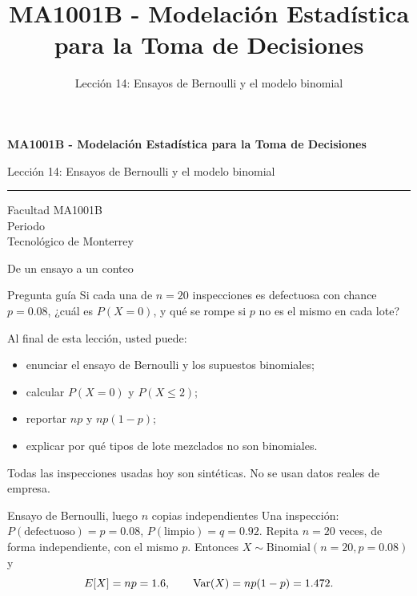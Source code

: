 \documentclass[aspectratio=169,10pt,spanish]{beamer}
\title{MA1001B - Modelación Estadística para la Toma de Decisiones}
\subtitle{Lección 14: Ensayos de Bernoulli y el modelo binomial}
\author{}
\institute{Tecnol\'ogico de Monterrey}
\date{}
\begin{document}
\begin{frame}[plain]
  \vspace{1.2cm}
  {\Large\bfseries MA1001B - Modelación Estadística para la Toma de Decisiones\par}
  \vspace{0.7cm}
  {\large Lección 14: Ensayos de Bernoulli y el modelo binomial\par}
  \vspace{0.7cm}
  {\color{TecRojo}\rule{\textwidth}{1.2pt}}
  \vspace{0.8cm}

  Facultad MA1001B\\[0.3cm]
  Periodo\\[0.3cm]
  Tecnol\'ogico de Monterrey
\end{frame}

\begin{frame}{De un ensayo a un conteo}
  \begin{alertblock}{Pregunta guía}
    Si cada una de $n=20$ inspecciones es defectuosa con chance $p=0.08$,
    ¿cuál es $P(X=0)$, y qué se rompe si $p$ no es el mismo en cada lote?
  \end{alertblock}

  \vspace{0.6em}
  Al final de esta lección, usted puede:
  \begin{itemize}
    \item enunciar el ensayo de Bernoulli y los supuestos binomiales;
    \item calcular $P(X=0)$ y $P(X\le 2)$;
    \item reportar $np$ y $np(1-p)$;
    \item explicar por qué tipos de lote mezclados no son binomiales.
  \end{itemize}

  \vfill
  \scriptsize Todas las inspecciones usadas hoy son sintéticas. No se usan datos reales de empresa.
\end{frame}

\begin{frame}{Ensayo de Bernoulli, luego $n$ copias independientes}
  \small
  Una inspección: $P(\text{defectuoso})=p=0.08$, $P(\text{limpio})=q=0.92$.
  Repita $n=20$ veces, de forma independiente, con el mismo $p$. Entonces
  $X\sim\mathrm{Binomial}(n=20,p=0.08)$ y
  \[
    E[X]=np=1.6,\qquad \operatorname{Var}(X)=np(1-p)=1.472.
  \]
\end{frame}
\end{document}
